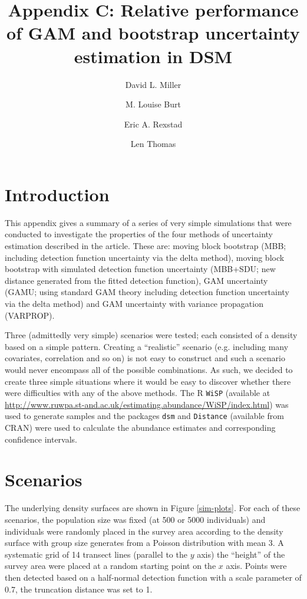 \documentclass[11pt]{amsart}
\title{Appendix C: Relative performance of GAM and bootstrap uncertainty estimation in DSM}
\author{David L. Miller \and
M. Louise Burt \and
Eric A. Rexstad \and 
Len Thomas}
\begin{document}
\maketitle


\section{Introduction}

This appendix gives a summary of a series of very simple simulations that were conducted to investigate the properties of the four methods of uncertainty estimation described in the article. These are: moving block bootstrap (MBB; including detection function uncertainty via the delta method), moving block bootstrap with simulated detection function uncertainty (MBB+SDU; new distance generated from the fitted detection function), GAM uncertainty (GAMU; using standard GAM theory including detection function uncertainty via the delta method) and GAM uncertainty with variance propagation (VARPROP).

Three (admittedly very simple) scenarios were tested; each consisted of a density based on a simple pattern. Creating a ``realistic'' scenario (e.g. including many covariates, correlation and so on) is not easy to construct and such a scenario would never encompass all of the possible combinations. As such, we decided to create three simple situations where it would be easy to discover whether there were difficulties with any of the above methods. The \textsf{R} \texttt{WiSP} (available at \url{http://www.ruwpa.st-and.ac.uk/estimating.abundance/WiSP/index.html}) was used to generate samples and the packages \texttt{dsm} and \texttt{Distance} (available from CRAN) were used to calculate the abundance estimates and corresponding confidence intervals.

\section{Scenarios}

The underlying density surfaces are shown in Figure \ref{sim-plots}. For each of these scenarios, the population size was fixed (at 500 or 5000 individuals) and individuals were randomly placed in the survey area according to the density surface with group size generates from a Poisson distribution with mean 3. A systematic grid of 14 transect lines (parallel to the $y$ axis) the ``height'' of the survey area were placed at a random starting point on the $x$ axis. Points were then detected based on a half-normal detection function with a scale parameter of 0.7, the truncation distance was set to 1.
\end{document}
